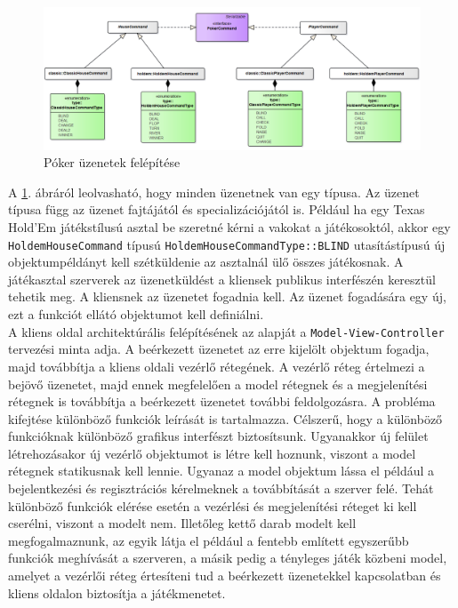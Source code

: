 \begin{figure}[h!]
	\caption{Póker üzenetek felépítése}
	\label{fig:messaging}
	\centering
	\includegraphics[width=\linewidth]{developer-documentation/images/messaging.png}
\end{figure}
A \ref{fig:messaging}. ábráról leolvasható, hogy minden üzenetnek van egy típusa. Az üzenet típusa függ az üzenet fajtájától és specializációjától is. Például ha egy Texas Hold'Em játékstílusú asztal be szeretné kérni a vakokat a játékosoktól, akkor egy \texttt{HoldemHouseCommand} típusú \texttt{HoldemHouseCommandType::BLIND} utasítástípusú új objektumpéldányt kell szétküldenie az asztalnál ülő összes játékosnak. A játékasztal szerverek az üzenetküldést a kliensek publikus interfészén keresztül tehetik meg. A kliensnek az üzenetet fogadnia kell. Az üzenet fogadására egy új, ezt a funkciót ellátó objektumot kell definiálni. \\
A kliens oldal architektúrális felépítésének az alapját a \texttt{Model-View-Controller} tervezési minta adja. A beérkezett üzenetet az erre kijelölt objektum fogadja, majd továbbítja a kliens oldali vezérlő rétegének. A vezérlő réteg értelmezi a bejövő üzenetet, majd ennek megfelelően a model rétegnek és a megjelenítési rétegnek is továbbítja a beérkezett üzenetet további feldolgozásra. A probléma kifejtése különböző funkciók leírását is tartalmazza. Célszerű, hogy a különböző funkcióknak különböző grafikus interfészt biztosítsunk. Ugyanakkor új felület létrehozásakor új vezérlő objektumot is létre kell hoznunk, viszont a model rétegnek statikusnak kell lennie. Ugyanaz a model objektum lássa el például a bejelentkezési és regisztrációs kérelmeknek a továbbítását a szerver felé. Tehát különböző funkciók elérése esetén a vezérlési és megjelenítési réteget ki kell cserélni, viszont a modelt nem. Illetőleg kettő darab modelt kell megfogalmaznunk, az egyik látja el például a fentebb említett egyszerűbb funkciók meghívását a szerveren, a másik pedig a tényleges játék közbeni model, amelyet a vezérlői réteg értesíteni tud a beérkezett üzenetekkel kapcsolatban és kliens oldalon biztosítja a játékmenetet.  \\
